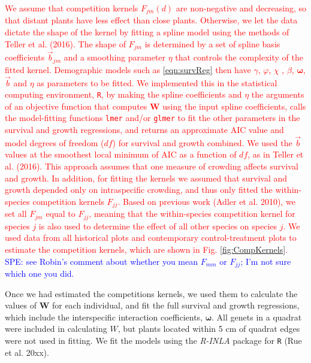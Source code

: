 \documentclass[11pt]{article}
\newcommand{\new}{\textcolor{red}}
\newcommand{\comment}{\textcolor{blue}}
\begin{document}
\begin{doublespacing}
\new{We assume that competition kernels $F_{jm}(d)$ are non-negative and decreasing, so that distant plants have less effect 
than close plants. Otherwise, we let the data dictate the shape of the kernel by fitting a spline model 
using the methods of Teller et al. (2016). The shape of $F_{jm}$ is determined by a set of spline basis coefficients $\vec{b}_{jm}$
and a smoothing parameter $\eta$ that controls the complexity of the fitted kernel. 
Demographic models such as \eqref{eqn:survReg} then have $\gamma$, $\varphi$, $\chi$ , 
$\beta$, $\boldsymbol{\omega}$, $\vec{b}$ and $\eta$ as parameters to be fitted. We implemented this in the statistical computing environment, \texttt{R}, 
by making the spline coefficients and $\eta$ the arguments of an objective function that computes $\boldsymbol{W}$ using the input spline coefficients, 
calls the model-fitting functions \texttt{lmer} and/or \texttt{glmer} to fit the other parameters in the survival and growth regressions, 
and returns an approximate AIC value and model degrees of freedom ($df$) for survival and growth combined. We used the $\vec{b}$ values at the smoothest 
local minimum of AIC as a function of $df$, as in Teller et al. (2016). This approach assumes that one measure of crowding affects 
survival and growth. In addition, for fitting the kernels we assumed that survival and growth depended only on intraspecific crowding, and thus only fitted the
within-species competition kernels $F_{jj}$. Based on previous work (Adler et al. 2010), we set all $F_{jm}$ equal to $F_{jj}$, meaning that 
the within-species competition kernel for species $j$ is also used to determine the effect of all other species on species $j$. We used data from all historical plots and contemporary control-treatment plots to estimate the competition kernels, which are shown in Fig. \ref{fig:CompKernels}. }
\comment{SPE: see Robin's comment about whether you mean $F_{mm}$ or $F_{jj}$; I'm not sure which one you did.}

Once we had estimated the competitions kernels, we used them to calculate the values of $\boldsymbol{W}$ for each individual, 
and fit the full survival and growth regressions, which include the interspecific interaction coefficients, $\boldsymbol{\omega}$. 
All genets in a quadrat were included in calculating $W$, but plants located within 5 cm of quadrat edges were not used in fitting. 
We fit the models using the \textit{R-INLA} package for \texttt{R} (Rue et al. 20xx). 


\end{doublespacing}
\end{document}
